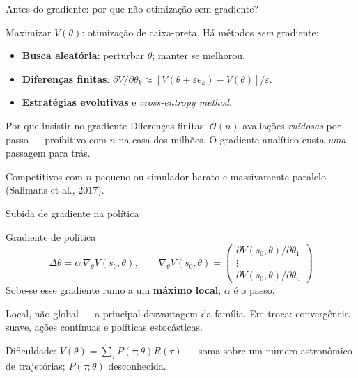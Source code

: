\documentclass[aspectratio=169, 11pt]{beamer}
\newcommand{\thv}{\theta}                       %
\newcommand{\gth}{\nabla_{\thv}}                %
\newcommand{\traj}{\tau}                        %
\newcommand{\Rtraj}{R(\traj)}
\newcommand{\Ptraj}{P(\traj;\thv)}
\begin{document}
\begin{frame}{Antes do gradiente: por que não otimização sem gradiente?}

  Maximizar $V(\thv)$: otimização de caixa-preta. Há métodos \emph{sem}
  gradiente:

  \begin{itemize}\setlength{\itemsep}{0.2ex}
    \item \textbf{Busca aleatória}: perturbar $\thv$; manter se melhorou.
    \item \textbf{Diferenças finitas}:
      $\partial V/\partial \thv_k \approx [V(\thv + \varepsilon e_k) - V(\thv)]/\varepsilon$.
    \item \textbf{Estratégias evolutivas} e \emph{cross-entropy method}.
  \end{itemize}

  \begin{teobox}{Por que insistir no gradiente}
    Diferenças finitas: $\mathcal{O}(n)$ avaliações \emph{ruidosas} por passo
    --- proibitivo com $n$ na casa dos milhões. O gradiente analítico custa
    \emph{uma} passagem para trás.
  \end{teobox}

  \begin{ideiabox}
    Competitivos com $n$ pequeno ou simulador barato e massivamente paralelo
    (Salimans et al., 2017).
  \end{ideiabox}
\end{frame}

\begin{frame}{Subida de gradiente na política}

  \begin{defbox}{Gradiente de política}
    \[
      \Delta \thv = \alpha\, \gth V(s_0,\thv),
      \qquad
      \gth V(s_0,\thv) =
      \begin{pmatrix}
        \partial V(s_0,\thv) / \partial \thv_1 \\[-0.2em]
        \vdots \\[-0.2em]
        \partial V(s_0,\thv) / \partial \thv_n
      \end{pmatrix}
    \]
    Sobe-se esse gradiente rumo a um \textbf{máximo local}; $\alpha$ é o passo.
  \end{defbox}

  \begin{alertabox}
    Local, não global --- a principal desvantagem da família. Em troca:
    convergência suave, ações contínuas e políticas estocásticas.
  \end{alertabox}

  Dificuldade: $V(\thv) = \sum_{\traj}\Ptraj \Rtraj$ --- soma sobre um número
  astronômico de trajetórias; $\Ptraj$ desconhecida.
\end{frame}
\end{document}
